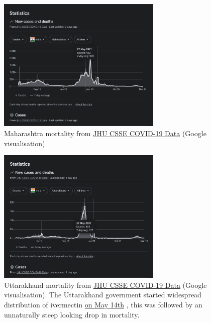\documentclass[11pt,a4paper,notitlepage]{report}
\begin{document}
\begin{figure}[h]
    \centering
    \includegraphics[width=0.7\textwidth]{india-maharashtra-mortality}
    \caption{Maharashtra mortality from \href{https://github.com/CSSEGISandData/COVID-19}{JHU CSSE COVID-19 Data} (Google visualisation)}
    \label{fig:india-maharashtra-mortality}
\end{figure}

\begin{figure}[h]
    \centering
    \includegraphics[width=0.7\textwidth]{india-uttarakhand-mortality}
    \caption{Uttarakhand mortality from \href{https://github.com/CSSEGISandData/COVID-19}{JHU CSSE COVID-19 Data} (Google visualisation). The Uttarakhand government started widespread distribution of ivermectin \href{https://economictimes.indiatimes.com/news/india/covid-19-ivermectin-tablets-to-be-distributed-among-uttarakhand-residents-says-state-govt/articleshow/82572159.cms}{on May 14th} \cite{economictimes12052021}, this was followed by an unnaturally steep looking drop in mortality.}
    \label{fig:india-uttarakhand-mortality}
\end{figure}
\end{document}

